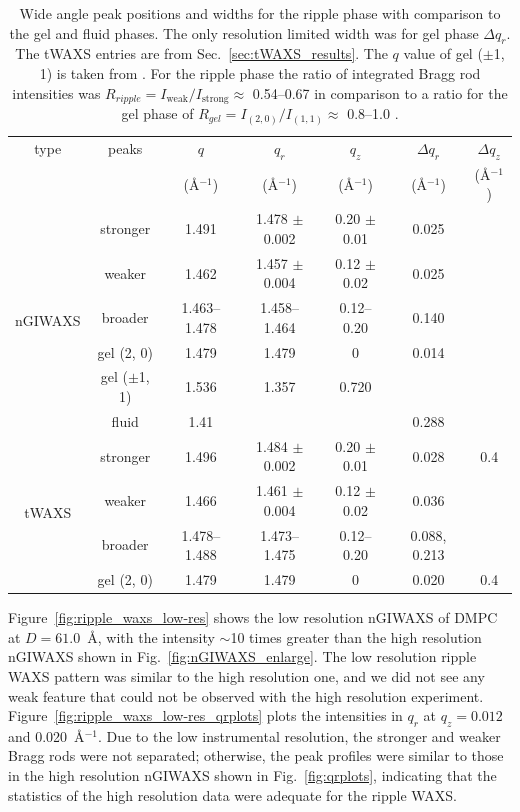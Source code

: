 \begin{table}[htbp]
  \centering
  \begin{tabular}{ccccccc}
    \hline
    type & peaks & $q$ & $q_r$ & $q_z$ & $\Delta q_r$ & $\Delta q_z$ \\
    & & (\AA$^{-1}$) & (\AA$^{-1}$) & (\AA$^{-1}$) & (\AA$^{-1}$) & (\AA$^{-1}$) \\
    \hline
    \multirow{6}{*}{nGIWAXS} & stronger & 1.491 & 1.478 $\pm$0.002 & 0.20 $\pm$0.01 & 0.025 \\
    & weaker          & 1.462 & 1.457 $\pm$0.004 & 0.12 $\pm$0.02 & 0.025 \\
    & broader         & 1.463--1.478 & 1.458--1.464 & 0.12--0.20 & 0.140 \\
    & gel (2, 0)      & 1.479 & 1.479 & 0 & 0.014 \\
    & gel ($\pm$1, 1) & 1.536 & 1.357 & 0.720 \\
    & fluid           & 1.41  &       &      & 0.288 \\
    \hline
    \multirow{4}{*}{tWAXS} & stronger & 1.496 & 1.484 $\pm$0.002 & 0.20 $\pm$0.01 &  0.028 & 0.4\\
    & weaker & 1.466 & 1.461 $\pm$0.004 & 0.12 $\pm$0.02 & 0.036 \\
    & broader & 1.478--1.488 & 1.473--1.475 & 0.12--0.20 & 0.088, 0.213 \\
    & gel (2, 0) & 1.479 & 1.479 & 0 & 0.020 & 0.4 \\
    \hline
  \end{tabular}
  \caption[Wide angle peak positions and widths for the ripple phase with comparison 
  to the gel and fluid phases]
  {Wide angle peak positions and widths for the ripple phase with comparison 
  to the gel and fluid phases. The only resolution limited width was for gel 
  phase $\Delta q_r$. The tWAXS entries are from 
  Sec.~\ref{sec:tWAXS_results}. 
  The $q$ value of gel ($\pm$1, 1) is taken from \cite{Tristram-Nagle02}.  
  For the ripple phase the ratio of integrated Bragg rod intensities was
  $R_{ripple} = I_\text{weak}/I_\text{strong} \approx$ 0.54--0.67 in 
  comparison to a ratio for the gel phase of 
  $R_{gel} = I_{(2,0)}/I_{(1,1)} \approx$ 0.8--1.0 
  \cite{ref:Akabori14}.}
  \label{tab:nGIWAXS_summary}
\end{table}

Figure~\ref{fig:ripple_waxs_low-res} shows the low resolution nGIWAXS of DMPC
at $D=61.0$~\AA, with the intensity $\sim$10 times greater than the high resolution
nGIWAXS shown in Fig.~\ref{fig:nGIWAXS_enlarge}. 
The low resolution ripple WAXS pattern was similar to the high resolution one,
and we did not see any weak feature that could not be observed
with the high resolution experiment. 
Figure~\ref{fig:ripple_waxs_low-res_qrplots} plots the intensities in $q_r$ at
$q_z=0.012$ and 0.020~\AA$^{-1}$. Due to the low instrumental resolution,
the stronger and weaker Bragg rods were not separated; otherwise,
the peak profiles were similar to those in the high resolution nGIWAXS shown
in Fig.~\ref{fig:qrplots}, indicating that the statistics of the high resolution
data were adequate for the ripple WAXS.

